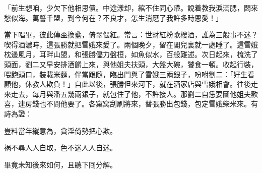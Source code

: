 \begin{myquote}
「前生想咱，少欠下他相思債。中途漾却，綰不住同心帶。說着教我淚滿腮，悶來愁似海。萬誓千盟，到今何在？不良才，怎生消磨了我許多時恩愛！」
\end{myquote}

當下唱畢，彼此傳盃換盞，倚翠偎紅。常言：世財紅粉歌樓酒，誰為三般事不迷？喫得酒濃時，這張勝就把雪娥來愛了。兩個晚夕，留在閣兒裏就一處睡了。這雪娥枕邊風月，耳畔山盟，和張勝儘力盤桓，如魚似水，百般難述。次日起來，梳洗了頭面，劉二又早安排酒餚上來，與他姐夫扶頭，大盤大碗，饕食一頓。收起行裝，喂飽頭口，裝載米麵，伴當跟隨，臨出門與了雪娥三兩銀子，吩咐劉二：「好生看顧他，休教人欺負！」自此以後，張勝但來河下，就在洒家店與雪娥相會。往後走來走去，每月與潘五幾兩銀子，就包住了他，不許接人。那劉二自恁要圖他姐夫歡喜，連房錢也不問他要了。各窠窝刮刷將來，替張勝出包錢，包定雪娥柴米來。有詩為證：

\begin{myquote}
豈料當年縱意為，貪淫倚勢把心欺。

祸不尋人人自取，色不迷人人自迷。
\end{myquote}

畢竟未知後來如何，且聽下囘分解。

